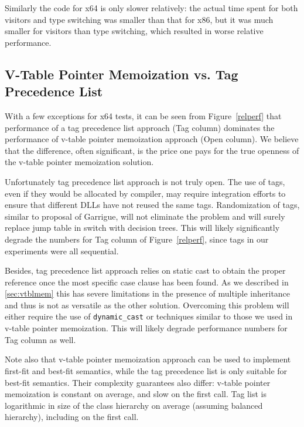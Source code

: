 \documentclass[preprint]{sigplanconf}
\makeatletter
\DeclareRobustCommand{\code}[1]{{\lstinline[breaklines=false,escapechar=@]{#1}}}
\makeatother
\begin{document}
Similarly the code for x64 is only slower relatively: the actual time spent for 
both visitors and type switching was smaller than that for x86, but it was much 
smaller for visitors than type switching, which resulted in worse relative 
performance.

\subsection{V-Table Pointer Memoization vs. Tag Precedence List}
\label{sec:cmp}

With a few exceptions for x64 tests, it can be seen from Figure~\ref{relperf} 
that performance of a tag precedence list approach (Tag column) dominates the 
performance of v-table pointer memoization approach (Open column). We believe 
that the difference, often significant, is the price one pays for the true 
openness of the v-table pointer memoization solution.

Unfortunately tag precedence list approach is not truly open. The use of tags, 
even if they would be allocated by compiler, may require integration efforts to 
ensure that different DLLs have not reused the same tags. Randomization of tags,
similar to proposal of Garrigue\cite{garrigue-98}, will not eliminate the 
problem and will surely replace jump table in switch with decision trees. This 
will likely significantly degrade the numbers for Tag column of 
Figure~\ref{relperf}, since tags in our experiments were all sequential.

Besides, tag precedence list approach relies on static cast to obtain the 
proper reference once the most specific case clause has been found. As we 
described in \textsection\ref{sec:vtblmem} this has severe limitations in the 
presence of multiple inheritance and thus is not as versatile as the other 
solution. Overcoming this problem will either require the use of 
\code{dynamic_cast} or techniques similar to those we used in v-table pointer 
memoization. This will likely degrade performance numbers for Tag column as well.

Note also that v-table pointer memoization approach can be used to implement 
first-fit and best-fit semantics, while the tag precedence list is only suitable 
for best-fit semantics. Their complexity guarantees also differ: v-table pointer 
memoization is constant on average, and slow on the first call. Tag list is 
logarithmic in size of the class hierarchy on average (assuming balanced 
hierarchy), including on the first call.
\end{document}
